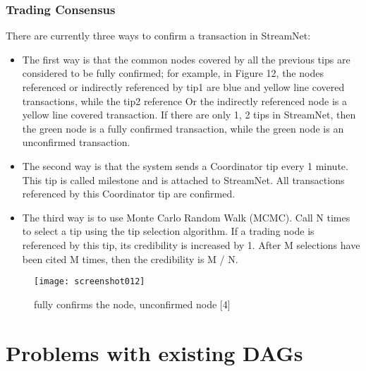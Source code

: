 \documentclass{article}
\begin{document}
\subsubsection{Trading Consensus}
There are currently three ways to confirm a transaction in StreamNet:
	\begin{itemize}
		\item The first way is that the common nodes covered by all the previous tips are considered to be fully confirmed; for example, in Figure 12, the nodes referenced or indirectly referenced by tip1 are blue and yellow line covered transactions, while the tip2 reference Or the indirectly referenced node is a yellow line covered transaction. If there are only 1, 2 tips in StreamNet, then the green node is a fully confirmed transaction, while the green node is an unconfirmed transaction.
		\item The second way is that the system sends a Coordinator tip every 1 minute. This tip is called milestone and is attached to StreamNet. All transactions referenced by this Coordinator tip are confirmed.
		\item The third way is to use Monte Carlo Random Walk (MCMC). Call N times to select a tip using the tip selection algorithm. If a trading node is referenced by this tip, its credibility is increased by 1. After M selections have been cited M times, then the credibility is M / N.
  \end{itemize}

\begin{figure}[H]
	\centering
	\texttt{[image: screenshot012]}
	\caption{fully confirms the node, unconfirmed node [4]}
	\label{simulationfigure}
\end{figure}

\section{Problems with existing DAGs}
\end{document}
